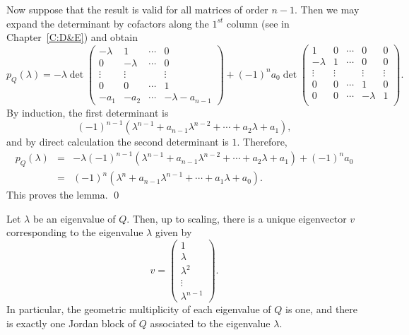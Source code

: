 Now suppose that the result is valid for all matrices of order $n-1$.  
Then we may expand the determinant by cofactors
 along the $1^{st}$ column (see  in 
Chapter~\ref{C:D&E}) and obtain 
{\small 
\[
p_Q(\lambda)  =  -\lambda \det\left(\begin{array}{cccc}
-\lambda & 1 &  \cdots & 0\\
0 & -\lambda &  \cdots & 0\\
\vdots & \vdots & & \vdots\\
0 & 0 & \cdots & 1\\
-a_1 & -a_2 & \cdots & -\lambda-a_{n-1}
\end{array}\right)
+(-1)^na_0\det\left(\begin{array}{ccccc}
1 & 0  & \cdots & 0 & 0\\
-\lambda &   1  & \cdots & 0 & 0\\
\vdots & \vdots & & \vdots & \vdots \\
0 & 0 & \cdots &  1  & 0\\
0 & 0 & \cdots & -\lambda & 1\\
\end{array}\right).
\]
}
By induction, the first determinant is 
\[
(-1)^{n-1}(\lambda^{n-1}+a_{n-1}\lambda^{n-2}+
\cdots+a_2\lambda+a_1),
\]
and by direct calculation the second determinant is $1$.  Therefore,
\begin{eqnarray*}
p_Q(\lambda) & = &
-\lambda (-1)^{n-1}(\lambda^{n-1}+a_{n-1}\lambda^{n-2}+
\cdots+a_2\lambda+a_1) +(-1)^n a_0 \\
& = & (-1)^n(\lambda^n+a_{n-1}\lambda^{n-1}+\cdots+a_1\lambda+a_0).
\end{eqnarray*}
This proves the lemma.   \qed

\begin{lemma}   \label{lem:ho2}
Let $\lambda$ be an eigenvalue of $Q$.  Then, up to scaling, there is a 
unique eigenvector $v$ corresponding to the eigenvalue $\lambda$ given by
\[
v = \left(\begin{array}{c}
1\\
\lambda\\
\lambda^2\\
\vdots\\
\lambda^{n-1}
\end{array}\right).
\]
In particular, the geometric 
multiplicity of each eigenvalue of $Q$ is 
one, and there is exactly one Jordan block 
of $Q$ associated to the eigenvalue $\lambda$.
\end{lemma}

